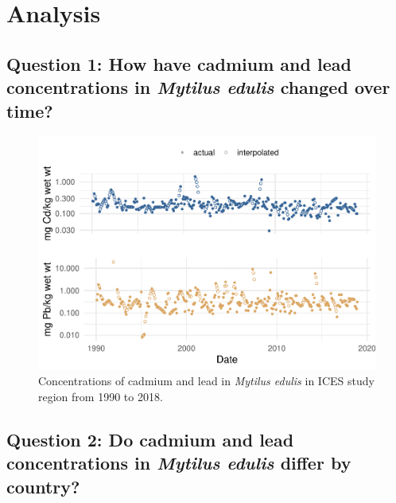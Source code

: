 \documentclass[
  12pt,
]{article}
\begin{document}
\newpage

\hypertarget{analysis}{%
\section{Analysis}\label{analysis}}

\hypertarget{question-1-how-have-cadmium-and-lead-concentrations-in-mytilus-edulis-changed-over-time}{%
\subsection{\texorpdfstring{Question 1: How have cadmium and lead
concentrations in \emph{Mytilus edulis} changed over
time?}{Question 1: How have cadmium and lead concentrations in Mytilus edulis changed over time?}}\label{question-1-how-have-cadmium-and-lead-concentrations-in-mytilus-edulis-changed-over-time}}

\begin{figure}
\centering
\includegraphics{McCrory_ENV972_Project_files/figure-latex/unnamed-chunk-5-1.pdf}
\caption{Concentrations of cadmium and lead in \emph{Mytilus edulis} in
ICES study region from 1990 to 2018.}
\end{figure}

\hypertarget{question-2-do-cadmium-and-lead-concentrations-in-mytilus-edulis-differ-by-country}{%
\subsection{\texorpdfstring{Question 2: Do cadmium and lead
concentrations in \emph{Mytilus edulis} differ by
country?}{Question 2: Do cadmium and lead concentrations in Mytilus edulis differ by country?}}\label{question-2-do-cadmium-and-lead-concentrations-in-mytilus-edulis-differ-by-country}}
\end{document}
